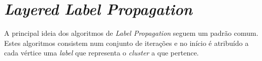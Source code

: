 \documentclass[a4paper,10pt]{report}
\begin{document}
\section*{\textit{Layered Label Propagation}}

  A principal ideia dos algoritmos de \textit{Label Propagation} seguem um padrão comum. Estes algoritmos consistem num conjunto de iterações e no início é atribuído a cada vértice uma \textit{label} que representa o \textit{cluster} a que pertence.
\end{document}
